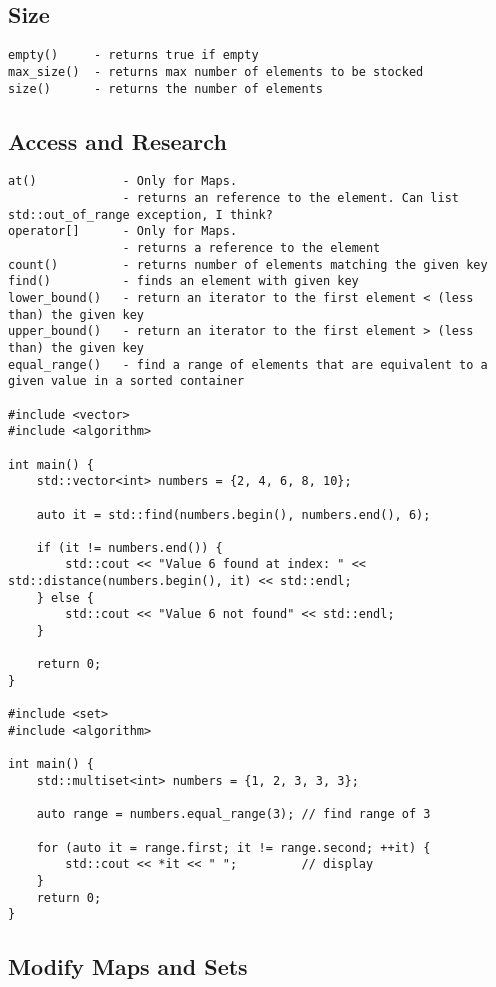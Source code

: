 \subsection{Size}

\begin{verbatim}
empty()     - returns true if empty
max_size()  - returns max number of elements to be stocked
size()      - returns the number of elements
\end{verbatim}

\subsection{Access and Research}

\begin{verbatim}
at()            - Only for Maps.
                - returns an reference to the element. Can list std::out_of_range exception, I think? 
operator[]      - Only for Maps.
                - returns a reference to the element
count()         - returns number of elements matching the given key
find()          - finds an element with given key
lower_bound()   - return an iterator to the first element < (less than) the given key
upper_bound()   - return an iterator to the first element > (less than) the given key
equal_range()   - find a range of elements that are equivalent to a given value in a sorted container

#include <vector>
#include <algorithm>

int main() {
    std::vector<int> numbers = {2, 4, 6, 8, 10};

    auto it = std::find(numbers.begin(), numbers.end(), 6);

    if (it != numbers.end()) {
        std::cout << "Value 6 found at index: " << std::distance(numbers.begin(), it) << std::endl;
    } else {
        std::cout << "Value 6 not found" << std::endl;
    }

    return 0;
}

#include <set>
#include <algorithm>

int main() {
    std::multiset<int> numbers = {1, 2, 3, 3, 3};

    auto range = numbers.equal_range(3); // find range of 3

    for (auto it = range.first; it != range.second; ++it) {
        std::cout << *it << " ";         // display
    }
    return 0;
}
\end{verbatim}

\subsection{Modify Maps and Sets}


